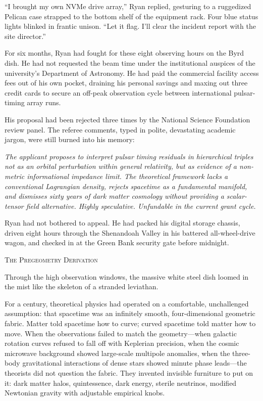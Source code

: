 \documentclass[12pt,twoside,openright]{book}
\newcommand{\sceneheader}[1]{%
  \par\vspace{1.8em}%
  {\noindent\centering\scshape\large #1\par}%
  \vspace{1.0em}%
  \noindent%
}
\newcommand{\dinkus}{%
  \par\vspace{1.2em}%
  {\noindent\centering{\large $\ast\quad\ast\quad\ast$}\par}%
  \vspace{1.2em}%
  \noindent%
}
\begin{document}
``I brought my own NVMe drive array,'' Ryan replied, gesturing to a
ruggedized Pelican case strapped to the bottom shelf of the equipment
rack. Four blue status lights blinked in frantic unison. ``Let it flag.
I'll clear the incident report with the site director.''

For six months, Ryan had fought for these eight observing hours on the
Byrd dish. He had not requested the beam time under the institutional
auspices of the university's Department of Astronomy. He had paid the
commercial facility access fees out of his own pocket, draining his
personal savings and maxing out three credit cards to secure an off-peak
observation cycle between international pulsar-timing array runs.

His proposal had been rejected three times by the National Science
Foundation review panel. The referee comments, typed in polite,
devastating academic jargon, were still burned into his memory:

\emph{The applicant proposes to interpret pulsar timing residuals in
hierarchical triples not as an orbital perturbation within general
relativity, but as evidence of a non-metric informational impedance
limit. The theoretical framework lacks a conventional Lagrangian
density, rejects spacetime as a fundamental manifold, and dismisses
sixty years of dark matter cosmology without providing a scalar-tensor
field alternative. Highly speculative. Unfundable in the current grant
cycle.}

Ryan had not bothered to appeal. He had packed his digital storage
chassis, driven eight hours through the Shenandoah Valley in his
battered all-wheel-drive wagon, and checked in at the Green Bank
security gate before midnight.

\dinkus

\sceneheader{The Pregeometry
Derivation}

Through the high observation windows, the massive white steel dish
loomed in the mist like the skeleton of a stranded leviathan.

For a century, theoretical physics had operated on a comfortable,
unchallenged assumption: that spacetime was an infinitely smooth,
four-dimensional geometric fabric. Matter told spacetime how to curve;
curved spacetime told matter how to move. When the observations failed
to match the geometry---when galactic rotation curves refused to fall
off with Keplerian precision, when the cosmic microwave background
showed large-scale multipole anomalies, when the three-body
gravitational interactions of dense stars showed minute phase
leads---the theorists did not question the fabric. They invented
invisible furniture to put on it: dark matter halos, quintessence, dark
energy, sterile neutrinos, modified Newtonian gravity with adjustable
empirical knobs.
\end{document}

